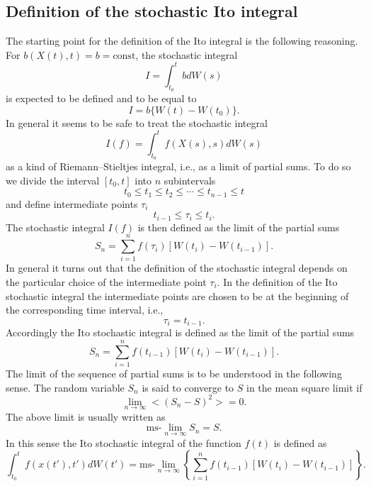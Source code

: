 \subsection{Definition of the stochastic Ito integral}
The starting point for the definition of the Ito integral is the
following reasoning. For $b(X(t),t)=b=\text{const}$, the stochastic 
integral
\begin{equation*}
I = \int_{t_0}^t bdW(s)
\end{equation*}
is expected to be defined and to be equal to
\begin{equation*}
I = b \{ W(t) - W(t_0) \}.
\end{equation*}
In general it seems to be safe to treat the stochastic 
integral 
\begin{equation*}
I(f) = \int_{t_0}^t f(X(s),s) dW(s)
\end{equation*}
as a kind of Riemann--Stieltjes integral, i.e., as a limit of 
partial sums. To do so we divide the interval $[t_0,t]$ into $n$
subintervals
\begin{equation*}
t_0 \le t_1 \le t_2 \le \cdots \le t_{n-1} \le t
\end{equation*}
and define intermediate points $\tau_i$
\begin{equation*}
t_{i-1} \le \tau_i \le t_i.
\end{equation*}
The stochastic integral $I(f)$ is then defined as the limit
of the partial sums
\begin{equation*}
S_n = \sum_{i=1}^n f(\tau_i) \left[  W(t_i) - W(t_{i-1}) \right].
\end{equation*}
In general it turns out that the definition of the stochastic 
integral depends on the particular choice of the intermediate 
point $\tau_i$. In the definition of the Ito stochastic integral
the intermediate points are chosen to be at the beginning of
the corresponding time interval, i.e.,
\begin{equation*}
\tau_i = t_{i-1}.
\end{equation*}
Accordingly the Ito stochastic integral is defined as the limit of 
the partial sums
\begin{equation*}
S_n = \sum_{i=1}^n f(t_{i-1}) [  W(t_i) - W(t_{i-1}) ].
\end{equation*}
The limit of the sequence of partial sums is to be understood in the
following sense. The random variable $S_n$ is said to converge to $S$
 in the mean square limit if
\begin{equation*}
\lim_{n \rightarrow \infty}
 <(S_n -S)^2> =0.
\end{equation*}
The above limit is usually written as
\begin{equation*}
\text{ms-} \lim_{n \rightarrow \infty} S_n = S.
\end{equation*}
In this sense the Ito stochastic integral of the function $f(t)$ is
defined as
\begin{equation*}
\int_{t_0}^t f(x(t'),t') dW(t') = \text{ms-}\lim_{n \rightarrow \infty}
   \left\{ \sum_{i=1}^{n} f(t_{i-1}) [W(t_i) - W(t_{i-1})]   \right\}.
\end{equation*}

